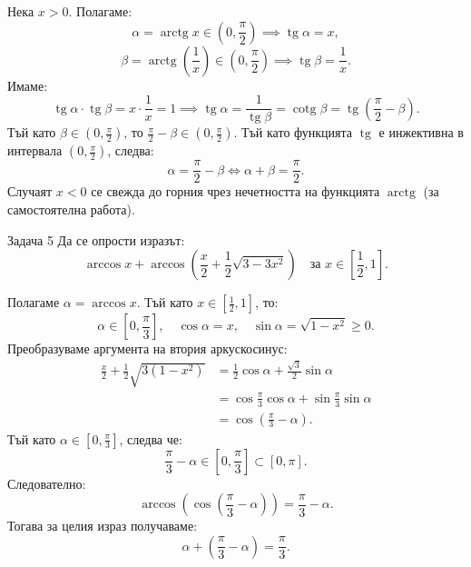 \begin{solution}
Нека $x > 0$. Полагаме:
\[
\alpha = \operatorname{arctg} x \in \left(0, \frac{\pi}{2}\right) \implies \operatorname{tg}\alpha = x,
\]
\[
\beta = \operatorname{arctg}\left(\frac{1}{x}\right) \in \left(0, \frac{\pi}{2}\right) \implies \operatorname{tg}\beta = \frac{1}{x}.
\]
Имаме:
\[
\operatorname{tg}\alpha \cdot \operatorname{tg}\beta = x \cdot \frac{1}{x} = 1 \implies \operatorname{tg}\alpha = \frac{1}{\operatorname{tg}\beta} = \operatorname{cotg}\beta = \operatorname{tg}\left(\frac{\pi}{2} - \beta\right).
\]
Тъй като $\beta \in \left(0, \frac{\pi}{2}\right)$, то $\frac{\pi}{2} - \beta \in \left(0, \frac{\pi}{2}\right)$. Тъй като функцията $\operatorname{tg}$ е инжективна в интервала $\left(0, \frac{\pi}{2}\right)$, следва:
\[
\alpha = \frac{\pi}{2} - \beta \iff \alpha + \beta = \frac{\pi}{2}.
\]
Случаят $x < 0$ се свежда до горния чрез нечетността на функцията $\operatorname{arctg}$ (за самостоятелна работа).
\end{solution}


\begin{problembox}{Задача 5}
Да се опрости изразът:
\[
\arccos x + \arccos\left(\frac{x}{2} + \frac{1}{2}\sqrt{3-3x^2}\right) \quad \text{за } x \in \left[\frac{1}{2}, 1\right].
\]
\end{problembox}

\begin{solution}
Полагаме $\alpha = \arccos x$. Тъй като $x \in \left[\frac{1}{2}, 1\right]$, то:
\[
\alpha \in \left[0, \frac{\pi}{3}\right], \quad \cos\alpha = x, \quad \sin\alpha = \sqrt{1-x^2} \ge 0.
\]
Преобразуваме аргумента на втория аркускосинус:
\begin{align*}
\frac{x}{2} + \frac{1}{2}\sqrt{3(1-x^2)} &= \frac{1}{2}\cos\alpha + \frac{\sqrt{3}}{2}\sin\alpha \\
&= \cos\frac{\pi}{3}\cos\alpha + \sin\frac{\pi}{3}\sin\alpha \\
&= \cos\left(\frac{\pi}{3} - \alpha\right).
\end{align*}
Тъй като $\alpha \in \left[0, \frac{\pi}{3}\right]$, следва че:
\[
\frac{\pi}{3} - \alpha \in \left[0, \frac{\pi}{3}\right] \subset [0, \pi].
\]
Следователно:
\[
\arccos\left(\cos\left(\frac{\pi}{3} - \alpha\right)\right) = \frac{\pi}{3} - \alpha.
\]
Тогава за целия израз получаваме:
\[
\alpha + \left(\frac{\pi}{3} - \alpha\right) = \frac{\pi}{3}.
\]
\end{solution}

